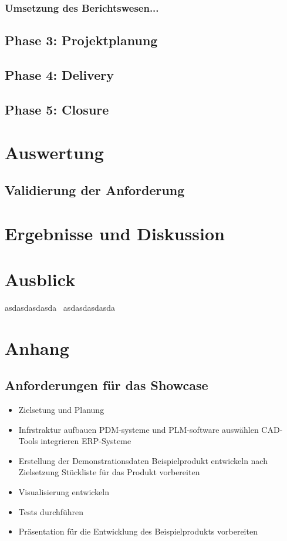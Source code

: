 \documentclass[a4paper, 12pt]{scrartcl}
\begin{document}
	\subsubsection{Umsetzung des Berichtswesen...}
	\newpage
	\subsection{Phase 3: Projektplanung}
	\newpage
	\subsection{Phase 4: Delivery}
	\newpage
	\subsection{Phase 5: Closure}
	\newpage
	\section{Auswertung}
	\subsection{Validierung der Anforderung}%
	\newpage
	\section{Ergebnisse und Diskussion}
		\newpage
	\section{Ausblick}
	asdasdasdasda~\cite{karmasin2017gestaltung}
	asdasdasdasda~\cite{example2025}
		\newpage
	\section{Anhang}
	
	
	\subsection{Anforderungen für das Showcase}
	\begin{itemize}
		\item Zielsetung und Planung
		\item Infrstraktur aufbauen
		\subitem PDM-systeme und PLM-software auswählen
		\subitem CAD-Tools integrieren
		\subitem ERP-Systeme 
		\item Erstellung der Demonstrationsdaten
		\subitem Beispielprodukt entwickeln nach Zielsetzung
		\subitem Stückliste für das Produkt vorbereiten
		\item Visualisierung entwickeln
		\item Tests durchführen
		\item Präsentation für die Entwicklung des Beispielprodukts vorbereiten 
	\end{itemize}
\end{document}
